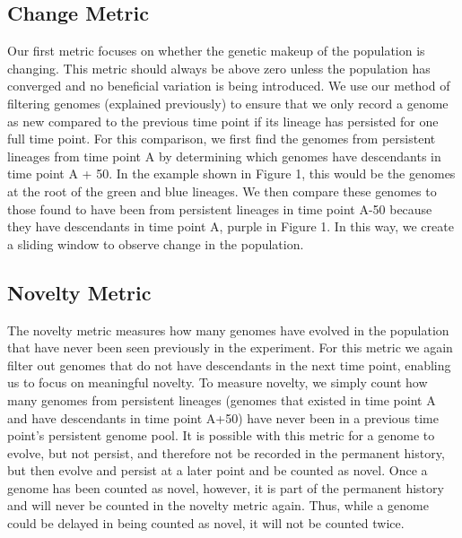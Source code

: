 \documentclass[letterpaper]{article}
\begin{document}
\subsection{Change Metric}
    Our first metric focuses on whether the genetic makeup of the population is changing. This metric should always be above zero unless the population has converged and no beneficial variation is being introduced. We use our method of filtering genomes (explained previously) to ensure that we only record a genome as new compared to the previous time point if its lineage has persisted for one full time point. For this comparison, we first find the genomes from persistent lineages from time point A by determining which genomes have descendants in time point A + 50. In the example shown in Figure 1, this would be the genomes at the root of the green and blue lineages. We then compare these genomes to those found to have been from persistent lineages in time point A-50 because they have descendants in time point A, purple in Figure 1. In this way, we create a sliding window to observe change in the population.

\subsection{Novelty Metric}
    The novelty metric measures how many genomes have evolved in the population that have never been seen previously in the experiment. For this metric we again filter out genomes that do not have descendants in the next time point, enabling us to focus on meaningful novelty. To measure novelty, we simply count how many genomes from persistent lineages (genomes that existed in time point A and have descendants in time point A+50) have never been in a previous time point’s persistent genome pool. It is possible with this metric for a genome to evolve, but not persist, and therefore not be recorded in the permanent history, but then evolve and persist at a later point and be counted as novel. Once a genome has been counted as novel, however, it is part of the permanent history and will never be counted in the novelty metric again. Thus, while a genome could be delayed in being counted as novel, it will not be counted twice.
    
\end{document}
